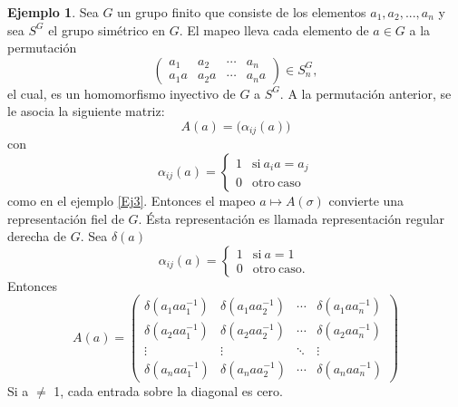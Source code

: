 \documentclass[12pt]{book}
\theoremstyle{definition}
\newtheorem{example}[theorem]{Ejemplo}
\newcounter{in}
\newcounter{ini}
\begin{document}
\begin{example}
  \label{Ej4}
  Sea $G$ un grupo finito que consiste de los elementos
  $a_{1},a_{2},...,a_{n}$ y sea $S^{G}$ el grupo simétrico en $G$. El
  mapeo lleva cada elemento de $a \in G$ a la permutación
  \begin{equation}
    \label{eq:6}
    \begin{pmatrix}
      a_{1} & a_{2} & \cdots  & a_{n}\\
      a_{1}a & a_{2}a & \cdots & a_{n}a
    \end{pmatrix} 
    \in S_{n}^{G},
  \end{equation}
  el cual, es un homomorfismo inyectivo de $G$ a $S^{G}$. A la permutación
  anterior, se le asocia la siguiente matriz:
  \begin{equation*}
    A(a)=\big(\alpha_{ij}(a)\big)
  \end{equation*}
  con
  \begin{equation*}
    \alpha_{ij}\left(a\right) = \left\{
      \begin{array}{ll}
        1      & \mathrm{si\ } a_{i}a = a_{j} \\
        0      & \mathrm{otro\ caso\ } 
      \end{array}
    \right.
  \end{equation*}
  como en el ejemplo \ref{Ej3}. Entonces el mapeo
  $a \mapsto A\left(\sigma\right)$ convierte una representación fiel de
  $G$. Ésta representación es llamada representación regular derecha de
  $G$. Sea $\delta\left(a\right)$
  \begin{equation*}
    \alpha_{ij}\left(a\right) = \left\{
      \begin{array}{ll}
        1      & \mathrm{si\ } a = 1 \\
        0      & \mathrm{otro\ caso.\ } 
      \end{array}
    \right.
  \end{equation*}
  Entonces
  \begin{equation}
    \label{eq:7}
    A\left(a\right) = 
    \begin{pmatrix}
      \delta\left(a_{1}aa_{1}^{-1}\right) & \delta\left(a_{1}aa_{2}^{-1}\right) & \cdots  & \delta\left(a_{1}aa_{n}^{-1}\right)\\
      \delta\left(a_{2}aa_{1}^{-1}\right) & \delta\left(a_{2}aa_{2}^{-1}\right) & \cdots  & \delta\left(a_{2}aa_{n}^{-1}\right)\\ 
      \vdots & \vdots & \ddots & \vdots\\
      \delta\left(a_{n}aa_{1}^{-1}\right) & \delta\left(a_{n}aa_{2}^{-1}\right) & \cdots  & \delta\left(a_{n}aa_{n}^{-1}\right)
    \end{pmatrix}
  \end{equation}
  Si a $\neq$ 1, cada entrada sobre la diagonal es cero.


\end{example}
\end{document}
